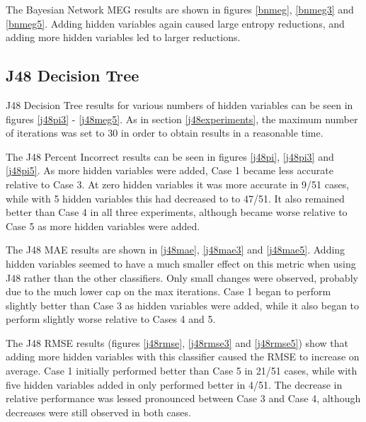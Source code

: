 The Bayesian Network MEG results are shown in figures \ref{bnmeg}, \ref{bnmeg3} and \ref{bnmeg5}. Adding hidden variables again caused large entropy reductions, and adding more hidden variables led to larger reductions.

\linespread{1.0}








\linespread{1.3}

\subsection{J48 Decision Tree}

J48 Decision Tree results for various numbers of hidden variables can be seen in figures \ref{j48pi3} - \ref{j48meg5}. As in section \ref{j48experiments}, the maximum number of iterations was set to 30 in order to obtain results in a reasonable time.

The J48 Percent Incorrect results can be seen in figures \ref{j48pi}, \ref{j48pi3} and \ref{j48pi5}. As more hidden variables were added, Case 1 became less accurate relative to Case 3. At zero hidden variables it was more accurate in 9/51 cases, while with 5 hidden variables this had decreased to to 47/51. It also remained better than Case 4 in all three experiments, although became worse relative to Case 5 as more hidden variables were added.

The J48 MAE results are shown in \ref{j48mae}, \ref{j48mae3} and \ref{j48mae5}. Adding hidden variables seemed to have a much smaller effect on this metric when using J48 rather than the other classifiers. Only small changes were observed, probably due to the much lower cap on the max iterations. Case 1 began to perform slightly better than Case 3 as hidden variables were added, while it also began to perform slightly worse relative to Cases 4 and 5.

The J48 RMSE results (figures \ref{j48rmse}, \ref{j48rmse3} and \ref{j48rmse5}) show that adding more hidden variables with this classifier caused the RMSE to increase on average. Case 1 initially performed better than Case 5 in 21/51 cases, while with five hidden variables added in only performed better in 4/51. The decrease in relative performance was lessed pronounced between Case 3 and Case 4, although decreases were still observed in both cases.


